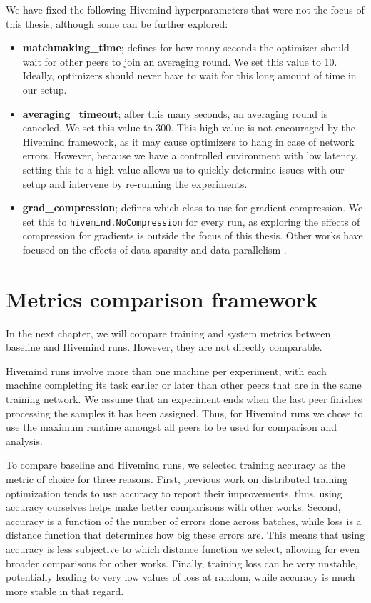 We have fixed the following Hivemind hyperparameters that were not the focus of this thesis, although some can be further explored:
\begin{itemize}
    \item \textbf{matchmaking\_time}; defines for how many seconds the optimizer should wait for other peers to join an averaging round.
          We set this value to 10.
          Ideally, optimizers should never have to wait for this long amount of time in our setup.
    \item \textbf{averaging\_timeout}; after this many seconds, an averaging round is canceled.
          We set this value to 300.
          This high value is not encouraged by the Hivemind framework, as it may cause optimizers to hang in case of network errors.
          However, because we have a controlled environment with low latency, setting this to a high value allows us to quickly determine issues with our setup and intervene by re-running the experiments.
    \item \textbf{grad\_compression}; defines which class to use for gradient compression.
          We set this to \texttt{hivemind.NoCompression} for every run, as exploring the effects of compression for gradients is outside the focus of this thesis.
          Other works have focused on the effects of data sparsity and data parallelism \cite{DBLP:journals/corr/abs-2003-11316}.
\end{itemize}

\section{Metrics comparison framework}

In the next chapter, we will compare training and system metrics between baseline and Hivemind runs.
However, they are not directly comparable.

Hivemind runs involve more than one machine per experiment, with each machine completing its task earlier or later than other peers that are in the same training network.
We assume that an experiment ends when the last peer finishes processing the samples it has been assigned.
Thus, for Hivemind runs we chose to use the maximum runtime amongst all peers to be used for comparison and analysis.

To compare baseline and Hivemind runs, we selected training accuracy as the metric of choice for three reasons.
First, previous work on distributed training optimization tends to use accuracy to report their improvements, thus, using accuracy ourselves helps make better comparisons with other works.
Second, accuracy is a function of the number of errors done across batches, while loss is a distance function that determines how big these errors are.
This means that using accuracy is less subjective to which distance function we select, allowing for even broader comparisons for other works.
Finally, training loss can be very unstable, potentially leading to very low values of loss at random, while accuracy is much more stable in that regard.

